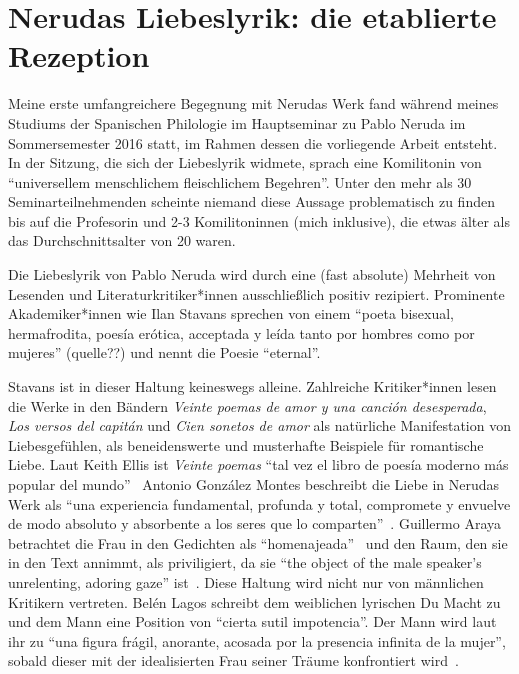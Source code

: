 \section{Nerudas Liebeslyrik: die etablierte Rezeption}

Meine erste umfangreichere Begegnung mit Nerudas Werk fand während meines Studiums der Spanischen Philologie im Hauptseminar zu Pablo Neruda im Sommersemester 2016 statt, im Rahmen dessen die vorliegende Arbeit entsteht.
In der Sitzung, die sich der Liebeslyrik widmete, sprach eine Komilitonin von ``universellem menschlichem fleischlichem Begehren''.
Unter den mehr als 30 Seminarteilnehmenden scheinte niemand diese Aussage problematisch zu finden bis auf die Profesorin und 2-3 Komilitoninnen (mich inklusive), die etwas älter als das Durchschnittsalter von 20 waren.

Die Liebeslyrik von Pablo Neruda wird durch eine (fast absolute) Mehrheit von Lesenden und Literaturkritiker*innen ausschließlich positiv rezipiert.
Prominente Akademiker*innen wie Ilan Stavans sprechen von einem ``poeta bisexual, hermafrodita, poesía erótica, acceptada y leída tanto por hombres como por mujeres'' (quelle??)
und nennt die Poesie ``eternal''\cite{Stavans2014}.

Stavans ist in dieser Haltung keineswegs alleine.
Zahlreiche Kritiker*innen lesen die Werke in den Bändern \textit{Veinte poemas de amor y una canción desesperada}, \textit{Los versos del capitán} und \textit{Cien sonetos de amor} als natürliche Manifestation von Liebesgefühlen, als beneidenswerte und musterhafte Beispiele für romantische Liebe.
Laut Keith Ellis ist \textit{Veinte poemas} ``tal vez el libro de poesía moderno más popular del mundo''~\cite{Ellis1985}
Antonio González Montes beschreibt die Liebe in Nerudas Werk als ``una experiencia fundamental, profunda y total, compromete y envuelve de modo absoluto y absorbente a los seres que lo comparten''~\cite{Montes1985}.
Guillermo Araya betrachtet die Frau in den Gedichten als ``homenajeada''~\cite{Araya1982} und den Raum, den sie in den Text annimmt, als priviligiert, da sie ``the object of the male speaker's unrelenting, adoring gaze'' ist~\cite{Duncan1992}.
Diese Haltung wird nicht nur von männlichen Kritikern vertreten.
Belén Lagos schreibt dem weiblichen lyrischen Du Macht zu und dem Mann eine Position von ``cierta sutil impotencia''.
Der Mann wird laut ihr zu ``una figura frágil, anorante, acosada por la presencia infinita de la mujer'', sobald dieser mit der idealisierten Frau seiner Träume konfrontiert wird~\cite{Lagos1975}.

